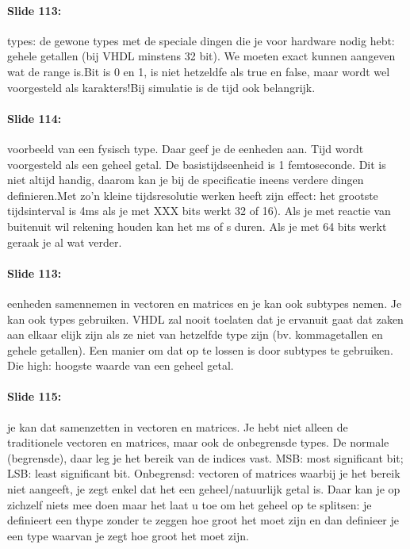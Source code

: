 \documentclass[10pt,a4paper]{book}
\begin{document}
\paragraph{Slide 113:} types: de gewone types met de speciale dingen die je voor hardware nodig hebt: gehele getallen (bij VHDL minstens 32 bit). We moeten exact kunnen aangeven wat de range is.Bit is 0 en 1, is niet hetzeldfe als true en false, maar wordt wel voorgesteld als karakters!Bij simulatie is de tijd ook belangrijk.

\paragraph{Slide 114:} voorbeeld van een fysisch type. Daar geef je de eenheden aan. Tijd wordt voorgesteld als een geheel getal. De basistijdseenheid is 1 femtoseconde. Dit is niet altijd handig, daarom kan je bij de specificatie ineens verdere dingen definieren.Met zo'n kleine tijdsresolutie werken heeft zijn effect: het grootste tijdsinterval is 4ms als je met XXX bits werkt 32 of 16). Als je met reactie van buitenuit wil rekening houden kan het ms of s duren. Als je met 64 bits werkt geraak je al wat verder. 

\paragraph{Slide 113:} eenheden samennemen in vectoren en matrices en je kan ook subtypes nemen. Je kan ook types gebruiken. VHDL zal nooit toelaten dat je ervanuit gaat dat zaken aan elkaar elijk zijn als ze niet van hetzelfde type zijn (bv. kommagetallen en gehele getallen). Een manier om dat op te lossen is door subtypes te gebruiken. Die high: hoogste waarde van een geheel getal.

\paragraph{Slide 115:} je kan dat samenzetten in vectoren en matrices. Je hebt niet alleen de traditionele vectoren en matrices, maar ook de onbegrensde types. De normale (begrensde), daar leg je het bereik van de indices vast. MSB: most significant bit; LSB: least significant bit. Onbegrensd: vectoren of matrices waarbij je het bereik niet aangeeft, je zegt enkel dat het een geheel/natuurlijk getal is. Daar kan je op zichzelf niets mee doen maar het laat u toe om het geheel op te splitsen: je definieert een thype zonder te zeggen hoe groot het moet zijn en dan definieer je een type waarvan je zegt hoe groot het moet zijn.
\end{document}
